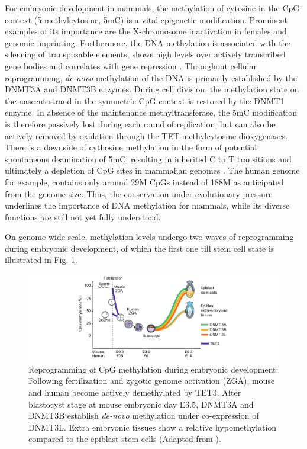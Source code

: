 For embryonic development in mammals, the methylation of cytosine in the CpG-context (5-methylcytosine, 5mC) is a vital epigenetic modification. Prominent examples of its importance are the X-chromosome inactivation in females and genomic imprinting.
Furthermore, the DNA methylation is associated with the silencing of transposable elements, shows high levels over actively transcribed gene bodies and correlates with gene repression \cite{Greenberg2019}.
Throughout cellular reprogramming, \textit{de-novo} methylation of the DNA is primarily established by the DNMT3A and DNMT3B enzymes. 
During cell division, the methylation state on the nascent strand in the symmetric CpG-context is restored by the DNMT1 enzyme.
In absence of the maintenance methyltransferase, the 5mC modification is therefore passively lost during each round of replication, but can also be actively removed by oxidation through the TET methylcytosine dioxygenases.
There is a downside of cythosine methylation in the form of potential spontaneous deamination of 5mC, resulting in inherited C to T transitions and ultimately a depletion of CpG sites in mammalian genomes \cite{Holliday1993}. 
The human genome for example, contains only around 29M CpGs instead of 188M as anticipated from the genome size. 
Thus, the conservation under evolutionary pressure underlines the importance of DNA methylation for mammals, while its diverse functions are still not yet fully understood.


On genome wide scale, methylation levels undergo two waves of reprogramming during embryonic development, of which the first one till stem cell state is illustrated in Fig. \ref{fig:intro:methylation}.


\begin{figure}[h]
	\centering
	\includegraphics[width=1.0\textwidth]{figures/intro/methylation.pdf}
	\captionsetup{format=plain}
	\caption[DNA methylation reprogramming]{Reprogramming of CpG methylation during embryonic development: Following fertilization and zygotic genome activation (ZGA), mouse and human become actively demethylated by TET3. After blastocyst stage at mouse embryonic day E3.5, DNMT3A and DNMT3B establish \textit{de-novo} methylation under co-expression of DNMT3L. Extra embryonic tissues show a relative hypomethylation compared to the epiblast stem cells (Adapted from \cite{Greenberg2019}).}
	\label{fig:intro:methylation}
\end{figure}

